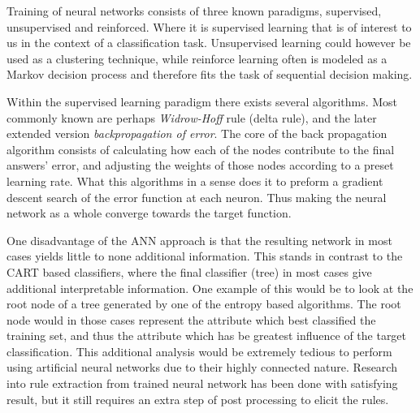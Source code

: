 	
	\bigskip\noindent
	Training of neural networks consists of three known paradigms, supervised, unsupervised and reinforced. 
	Where it is supervised learning that is of interest to us in the context of a classification task. 
	Unsupervised learning could however be used as a clustering technique, 
	while reinforce learning often is modeled as a Markov decision process and therefore fits the task of sequential decision making. \cite{bioAI}
	
	\bigskip\noindent
	Within the supervised learning paradigm there exists several algorithms. 
	Most commonly known are perhaps \textit{Widrow-Hoff} rule (delta rule)\cite{widrowhoff}, and the later extended version \textit{backpropagation of error}\cite{rumelhart1986learning}\cite{rumelhart1986parallel}. 
	The core of the back propagation algorithm consists of calculating how each of the nodes contribute to the final answers' error, 
	and adjusting the weights of those nodes according to a preset learning rate. 
	What this algorithms in a sense does it to preform a gradient descent search of the error function at each neuron.
	Thus making the neural network as a whole converge towards the target function. 
	
	\bigskip\noindent
	One disadvantage of the ANN approach is that the resulting network in most cases yields little to none additional information.
	This stands in contrast to the CART based classifiers, where the final classifier (tree) in most cases give additional interpretable information. 
	One example of this would be to look at the root node of a tree generated by one of the entropy based algorithms.
	The root node would in those cases represent the attribute which best classified the training set, 
	and thus the attribute which has be greatest influence of the target classification. 
	This additional analysis would be extremely tedious to perform using artificial neural networks due to their highly connected nature.
	Research into rule extraction from trained neural network has been done with satisfying result, 
	but it still requires an extra step of post processing to elicit the rules.~\cite{augastarule}
	
	
	
	
	
	